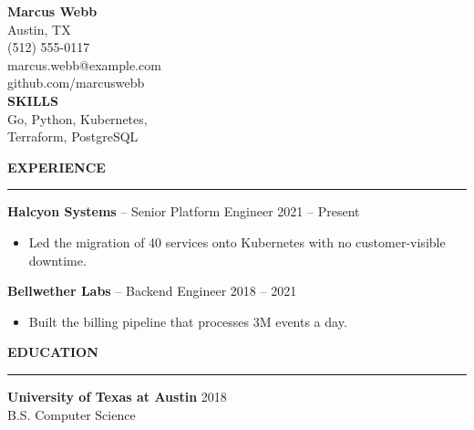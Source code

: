 \documentclass[letterpaper,11pt]{article}
\newcommand{\heading}[1]{\vspace{5pt}\textbf{#1}\vspace{3pt}\hrule\vspace{3pt}}
\begin{document}
\noindent\begin{minipage}[t]{0.32\textwidth}
\raggedright
{\large \textbf{Marcus Webb}}\\[6pt]
Austin, TX\\
(512) 555-0117\\
marcus.webb@example.com\\
github.com/marcuswebb\\[8pt]
\textbf{SKILLS}\\
Go, Python, Kubernetes,\\
Terraform, PostgreSQL
\end{minipage}\hfill
\begin{minipage}[t]{0.63\textwidth}
\heading{EXPERIENCE}
\textbf{Halcyon Systems} -- Senior Platform Engineer \hfill 2021 -- Present
\begin{itemize}
  \item Led the migration of 40 services onto Kubernetes with no customer-visible downtime.
\end{itemize}
\textbf{Bellwether Labs} -- Backend Engineer \hfill 2018 -- 2021
\begin{itemize}
  \item Built the billing pipeline that processes 3M events a day.
\end{itemize}

\heading{EDUCATION}
\textbf{University of Texas at Austin} \hfill 2018\\
B.S. Computer Science
\end{minipage}
\end{document}
